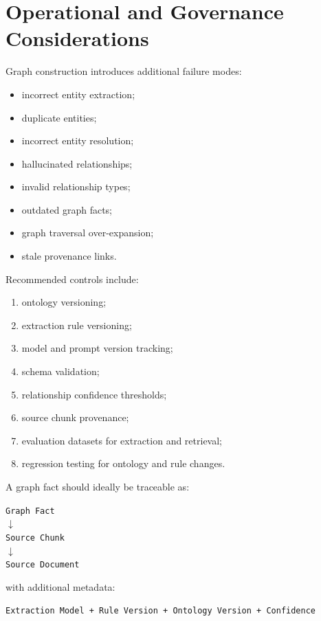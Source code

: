 \documentclass[11pt,a4paper]{article}
\begin{document}
\section{Operational and Governance Considerations}

Graph construction introduces additional failure modes:

\begin{itemize}
\item incorrect entity extraction;
\item duplicate entities;
\item incorrect entity resolution;
\item hallucinated relationships;
\item invalid relationship types;
\item outdated graph facts;
\item graph traversal over-expansion;
\item stale provenance links.
\end{itemize}

Recommended controls include:

\begin{enumerate}
\item ontology versioning;
\item extraction rule versioning;
\item model and prompt version tracking;
\item schema validation;
\item relationship confidence thresholds;
\item source chunk provenance;
\item evaluation datasets for extraction and retrieval;
\item regression testing for ontology and rule changes.
\end{enumerate}

A graph fact should ideally be traceable as:

\begin{center}
\texttt{Graph Fact}\\
$\downarrow$\\
\texttt{Source Chunk}\\
$\downarrow$\\
\texttt{Source Document}
\end{center}

with additional metadata:

\begin{center}
\texttt{Extraction Model + Rule Version + Ontology Version + Confidence}
\end{center}
\end{document}
